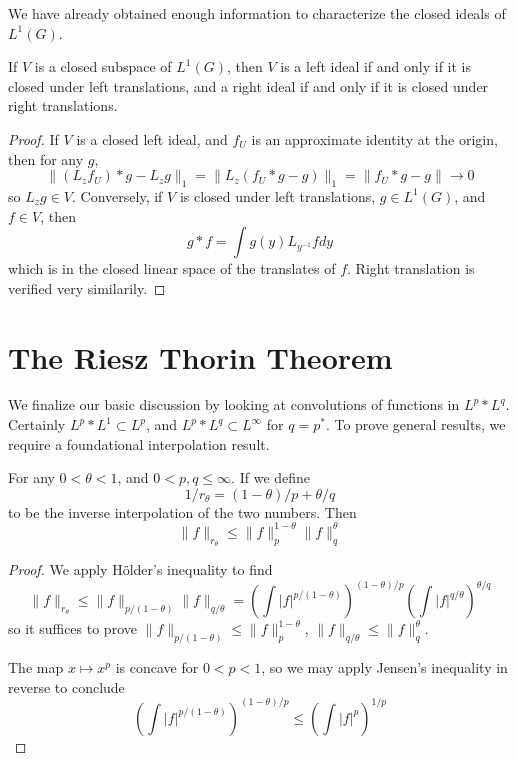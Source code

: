 We have already obtained enough information to characterize the closed ideals of $L^1(G)$.

\begin{theorem}
    If $V$ is a closed subspace of $L^1(G)$, then $V$ is a left ideal if and only if it is closed under left translations, and a right ideal if and only if it is closed under right translations.
\end{theorem}
\begin{proof}
    If $V$ is a closed left ideal, and $f_U$ is an approximate identity at the origin, then for any $g$,
    \[ \| (L_z f_U) * g - L_z g \|_1 = \| L_z (f_U * g - g) \|_1 = \| f_U * g - g \| \to 0 \]
    so $L_z g \in V$. Conversely, if $V$ is closed under left translations, $g \in L^1(G)$, and $f \in V$, then
    \[ g * f = \int g(y) L_{y^{-1}} f dy \]
    which is in the closed linear space of the translates of $f$. Right translation is verified very similarily.
\end{proof}

\section{The Riesz Thorin Theorem}

We finalize our basic discussion by looking at convolutions of functions in $L^p * L^q$. Certainly $L^p * L^1 \subset L^p$, and $L^p * L^q \subset L^\infty$ for $q = p^*$. To prove general results, we require a foundational interpolation result.
%
\begin{theorem}
    For any $0 < \theta < 1$, and $0 < p,q \leq \infty$. If we define
    \[ 1/r_\theta = (1-\theta)/p + \theta/q \]
    to be the inverse interpolation of the two numbers. Then
    \[ \| f \|_{r_\theta} \leq \| f \|_p^{1-\theta} \| f \|_q^\theta \]
\end{theorem}
\begin{proof}
    We apply H\"{o}lder's inequality to find
    \[ \| f \|_{r_\theta} \leq \| f \|_{p/(1 - \theta)} \| f \|_{q/\theta} = \left( \int |f|^{p/(1 - \theta)} \right)^{(1-  \theta)/p} \left( \int |f|^{q/\theta} \right)^{\theta/q} \]
    so it suffices to prove $\| f \|_{p/(1-\theta)} \leq \| f \|_p^{1-\theta}$, $\| f \|_{q/\theta} \leq \| f \|_q^\theta$.

    The map $x \mapsto x^p$ is concave for $0 < p < 1$, so we may apply Jensen's inequality in reverse to conclude
    \[ \left( \int |f|^{p/(1 - \theta)} \right)^{(1-  \theta)/p} \leq \left( \int |f|^p \right)^{1/p} \]
\end{proof}

